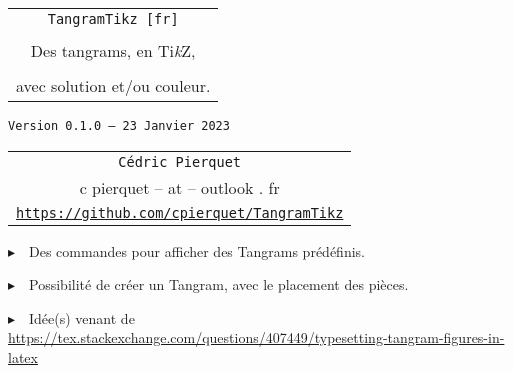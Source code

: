 \documentclass{article}
\def\TPversion{0.1.0}
\def\TPdate{23 Janvier 2023}
\begin{document}
\pagestyle{fancy}

\thispagestyle{empty}

\vspace{2cm}

\begin{center}
	\begin{minipage}{0.75\linewidth}
	\begin{tcolorbox}[colframe=yellow,colback=yellow!15]
		\begin{center}
			\begin{tabular}{c}
				{\Huge \texttt{TangramTikz [fr]}}\\
				\\
				{\LARGE Des tangrams, en Ti\textit{k}Z}, \\
				\\
				{\LARGE avec solution et/ou couleur.} \\
			\end{tabular}
			
			\medskip
			
			{\small \texttt{Version \TPversion{} -- \TPdate}}
		\end{center}
	\end{tcolorbox}
\end{minipage}
\end{center}

\vspace{0.5cm}

\begin{center}
	\begin{tabular}{c}
	\texttt{Cédric Pierquet}\\
	{\ttfamily c pierquet -- at -- outlook . fr}\\
	\texttt{\url{https://github.com/cpierquet/TangramTikz}}
\end{tabular}
\end{center}

\vspace{0.5cm}

{$\blacktriangleright$~~Des commandes pour afficher des Tangrams prédéfinis.}

\smallskip

{$\blacktriangleright$~~Possibilité de créer un Tangram, avec le placement des pièces.}

\smallskip

{$\blacktriangleright$~~Idée(s) venant de \url{https://tex.stackexchange.com/questions/407449/typesetting-tangram-figures-in-latex}}

\vspace{1cm}
\end{document}
